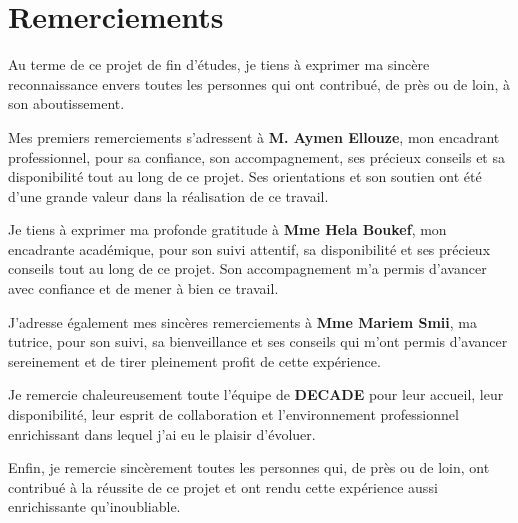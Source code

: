 
\chapter*{Remerciements}
\thispagestyle{empty}

\vspace*{1cm}

Au terme de ce projet de fin d’études, je tiens à exprimer ma sincère reconnaissance envers toutes les personnes qui ont contribué, de près ou de loin, à son aboutissement.

Mes premiers remerciements s’adressent à \textbf{M. Aymen Ellouze}, mon encadrant professionnel, pour sa confiance, son accompagnement, ses précieux conseils et sa disponibilité tout au long de ce projet. Ses orientations et son soutien ont été d’une grande valeur dans la réalisation de ce travail.

Je tiens à exprimer ma profonde gratitude à \textbf{Mme Hela Boukef}, mon encadrante académique, pour son suivi attentif, sa disponibilité et ses précieux conseils tout au long de ce projet. Son accompagnement m’a permis d’avancer avec confiance et de mener à bien ce travail.

J’adresse également mes sincères remerciements à \textbf{Mme Mariem Smii}, ma tutrice, pour son suivi, sa bienveillance et ses conseils qui m’ont permis d’avancer sereinement et de tirer pleinement profit de cette expérience.

Je remercie chaleureusement toute l’équipe de \textbf{DECADE} pour leur accueil, leur disponibilité, leur esprit de collaboration et l’environnement professionnel enrichissant dans lequel j’ai eu le plaisir d’évoluer.

Enfin, je remercie sincèrement toutes les personnes qui, de près ou de loin, ont contribué à la réussite de ce projet et ont rendu cette expérience aussi enrichissante qu’inoubliable.
